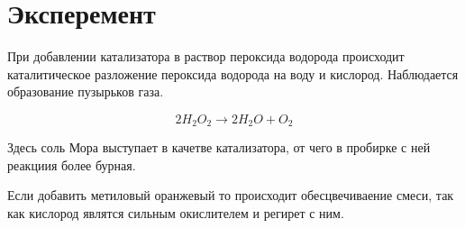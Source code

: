 \section{Эксперемент}
При добавлении катализатора в раствор пероксида 
водорода происходит каталитическое разложение 
пероксида водорода на воду и кислород. 
Наблюдается образование пузырьков газа.

\begin{equation} 
 2H_2O_2 \xrightarrow{} 2H_2O + O_2
\end{equation} 

Здесь соль Мора выступает в качетве катализатора, 
от чего в пробирке с ней реакциия более бурная.

Если добавить метиловый оранжевый то происходит 
обесцвечиваение смеси, так как кислород являтся сильным 
окислителем и регирет с ним. 